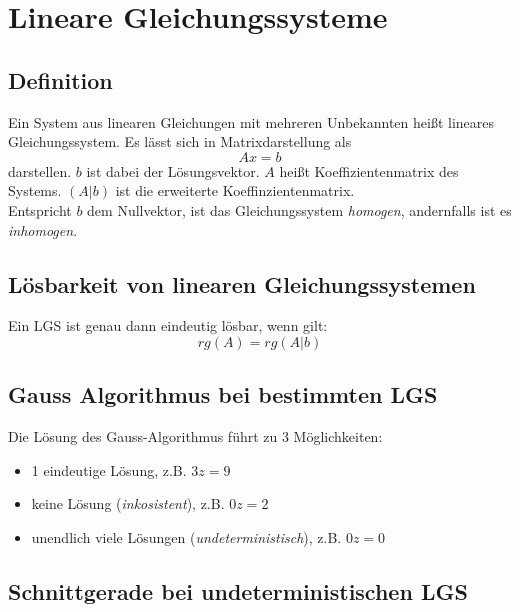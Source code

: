 
\section{Lineare Gleichungssysteme}
\label{sec:lineare_gleichungssysteme}

\subsection{Definition}
\label{sub:definition}

Ein System aus linearen Gleichungen mit mehreren Unbekannten heißt lineares Gleichungssystem. Es lässt
sich in Matrixdarstellung als 
\begin{equation}
	Ax = b
\end{equation}
darstellen. $b$ ist dabei der Lösungsvektor. $A$ heißt Koeffizientenmatrix des Systems. $(A|b)$ ist die erweiterte
Koeffinzientenmatrix. \\
Entspricht $b$ dem Nullvektor, ist das Gleichungssystem \emph{homogen}, andernfalls ist es 
\emph{inhomogen}.

\subsection{L\"{o}sbarkeit von linearen Gleichungssystemen} %
\label{sub:loesbarkeit_von_linearen_gleichungssystemen}

Ein LGS ist genau dann eindeutig lösbar, wenn gilt:
\begin{equation}
	rg(A) = rg(A|b)
\end{equation}

\subsection{Gauss Algorithmus bei bestimmten LGS}
\label{sub:gauss_algorithmus_bei_bestimmten_lgs}

Die Lösung des Gauss-Algorithmus führt zu 3 Möglichkeiten:

\begin{itemize}
	\item 1 eindeutige Lösung, z.B. $3z = 9$
	\item keine Lösung (\emph{inkosistent}), z.B. $0z = 2$
	\item unendlich viele Lösungen (\emph{undeterministisch}), z.B. $0z = 0$
\end{itemize}

\subsection{Schnittgerade bei undeterministischen LGS}
\label{sub:schnittgerade_bei_undeterministischen_lgs}

